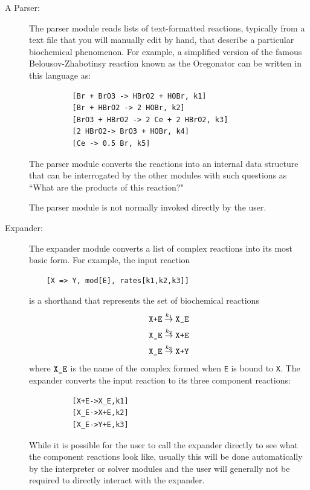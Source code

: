\begin{description}
\item [A Parser:]

The parser module reads lists of text-formatted reactions, typically from a text file that you will manually edit by hand, that describe a particular biochemical phenomenon.  For example, a simplified version of the famous Belousov-Zhabotinsy reaction\cite{BZ1,BZ2} known as the Oregonator\cite{Oregonator1,Oregonator2} can be written in this language as:

\begin{lstlisting}
          [Br + BrO3 -> HBrO2 + HOBr, k1] 
          [Br + HBrO2 -> 2 HOBr, k2]
          [BrO3 + HBrO2 -> 2 Ce + 2 HBrO2, k3] 
          [2 HBrO2-> BrO3 + HOBr, k4] 
          [Ce -> 0.5 Br, k5]
\end{lstlisting}

The parser module converts the reactions into an internal data structure that can be interrogated by the other modules with such questions as ``What are the products of this reaction?"

The parser module is not normally invoked directly by the user. 

\item [Expander:] The expander module converts a list of complex reactions into its most basic form. For example, the input reaction

\begin{lstlisting}
	[X => Y, mod[E], rates[k1,k2,k3]]
\end{lstlisting}

is a shorthand that represents the set of biochemical reactions
\begin{align*}
\text{\tt{X+E}}&\overset{k_1}{\to}\text{\tt{X\_E}}\\
\text{\tt{X\_E}}&\overset{k_2}{\to}\text{\tt{X+E}}\\
\text{\tt{X\_E}}&\overset{k_3}{\to}\text{\tt{X+Y}}
\end{align*}
where $\text{\tt{X\_E}}$ is the name of the complex formed when {\tt E} is bound to {\tt X}.  The expander converts the input reaction to its three component reactions: 
\begin{lstlisting}
          [X+E->X_E,k1]
          [X_E->X+E,k2]
          [X_E->Y+E,k3]
\end{lstlisting}

While it is possible for the user to call the expander directly to see what the component reactions look like, usually this will be done automatically by the interpreter or solver modules and the user will generally not be required to directly interact with the expander. 


\end{description}

